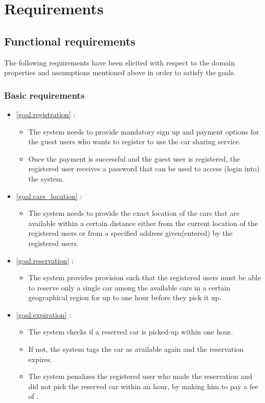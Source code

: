 \chapter{Requirements}

\section{Functional requirements}
The following requirements have been elicited with respect to the domain properties and assumptions mentioned above in order to satisfy the goals.

\subsection{Basic requirements}
\begin{itemize}
	\item \ref{goal:registration} :
	\begin{itemize}
		\item The system needs to provide mandatory sign up and payment options for the guest users who wants to register to use the car sharing service.
		\item Once the payment is successful and the guest user is registered, the registered user receives a password that can be used to access (login into) the system.
	\end{itemize}

	\item \ref{goal:cars_location} :
	\begin{itemize}
		\item The system needs to provide the exact location of the cars that are available within a certain distance either from the current location of the registered users or from a specified address given(entered) by the registered users.
	\end{itemize}

	\item \ref{goal:reservation} :
	\begin{itemize}
		\item The system provides provision such that the registered users must be able to reserve only a single car among the available cars in a certain geographical region for up to one hour before they pick it up.
	\end{itemize}

	\item \ref{goal:expiration} :
	\begin{itemize}
		\item The system checks if a reserved car is picked-up within one hour.
		\item If not, the system tags the car as available again and the reservation expires.
		\item The system penalizes the registered user who made the reservation and did not pick the reserved car within an hour, by making him to pay a fee of .
	\end{itemize}


\end{itemize}
